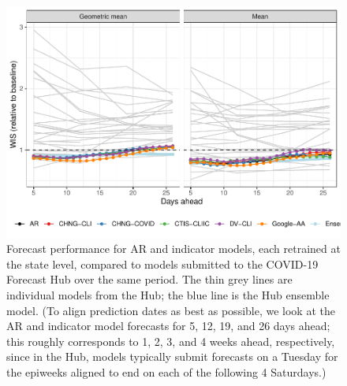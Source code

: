 \documentclass[9pt,twoside,lineno]{pnas-new}
\begin{document}
\clearpage

\begin{figure}

{\centering \includegraphics[width=\textwidth]{fig/compare-states-to-hub} 

}

\caption{Forecast performance for AR and indicator models, each retrained at the state level, compared to models submitted to the COVID-19 Forecast Hub over the same period. The thin grey lines are individual models from the Hub; the blue line is the Hub ensemble model. (To align prediction dates as best as possible, we look at the AR and indicator model forecasts for 5, 12, 19, and 26 days ahead; this roughly corresponds to 1, 2, 3, and 4 weeks ahead, respectively, since in the Hub, models typically submit forecasts on a Tuesday for the epiweeks aligned to end on each of the following 4 Saturdays.)}\label{fig:compare-to-hub}
\end{figure}

\clearpage
\end{document}
